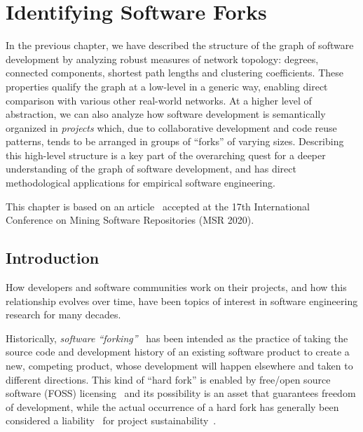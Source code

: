 \chapter{Identifying Software Forks}%
\label{chp:forks}

In the previous chapter, we have described the structure of the graph of
software development by analyzing robust measures of network topology: degrees,
connected components, shortest path lengths and clustering coefficients. These
properties qualify the graph at a low-level in a generic way, enabling direct
comparison with various other real-world networks. At a higher level of
abstraction, we can also analyze how software development is semantically
organized in \emph{projects} which, due to collaborative development and code
reuse patterns, tends to be arranged in groups of ``forks'' of varying sizes.
Describing this high-level structure is a key part of the overarching quest for
a deeper understanding of the graph of software development, and has direct
methodological applications for empirical software engineering.

This chapter is based on an article~\cite{swh-msr2020-forking} accepted at the
17th International Conference on Mining Software Repositories (MSR 2020).

\section{Introduction}
\label{sec:forks-intro}

How developers and software communities work on their projects, and how this
relationship evolves over time, have been topics of interest in software
engineering research for many decades.

Historically, \emph{software ``forking''}~\cite{nyman2016forkhistory} has been
intended as the practice of taking the source code and development history of
an existing software product to create a new, competing product, whose
development will happen elsewhere and taken to different directions. This kind
of ``hard fork'' is enabled by free/open source software (FOSS)
licensing~\cite{fogel2005producingoss} and its possibility is an asset that
guarantees freedom of development, while the actual occurrence of a hard fork
has generally been considered a liability~\cite{robles2012forks} for project
sustainability~\cite{nyman2011-fork-or-not, nyman2014forking-hackers,
  rastogi2016forking}.

